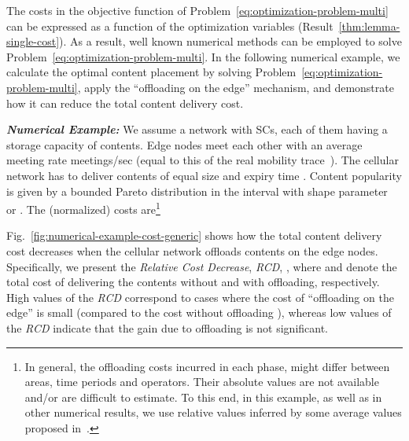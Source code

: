 \documentclass[10pt,conference,letterpaper]{IEEEtran}
\begin{document}
The costs  in the objective function of Problem~\ref{eq:optimization-problem-multi} can be expressed as a function of the optimization variables (Result~\ref{thm:lemma-single-cost}). As a result, well known numerical methods can be employed to solve Problem~\ref{eq:optimization-problem-multi}. In the following numerical example, we calculate the optimal content placement by solving Problem~\ref{eq:optimization-problem-multi}, apply the ``offloading on the edge'' mechanism, and demonstrate how it can reduce the total content delivery cost.

\textbf{\textit{Numerical Example:}} We assume a network with  SCs, each of them having a storage capacity of  contents. Edge nodes meet each other with an average meeting rate  meetings/sec (equal to this of the real mobility trace~\cite{infocom-trace}). The cellular network has to deliver  contents of equal size and expiry time . Content popularity is given by a bounded Pareto distribution in the interval  with shape parameter ~\cite{youtube-traffic-from-edge} or . The (normalized) costs are\footnote{In general, the offloading costs incurred in each phase, might differ between areas, time periods and operators. Their absolute values are not available and/or are difficult to estimate. To this end, in this example, as well as in other numerical results, we use relative values inferred by some average values proposed in~\cite{johansson2007cost}.} 


Fig.~\ref{fig:numerical-example-cost-generic} shows how the total content delivery cost decreases when the cellular network offloads contents on the edge nodes. Specifically, we present the \textit{Relative Cost Decrease}, \textit{RCD}, , where  and  denote the total cost of delivering the contents without and with offloading, respectively. High values of the \textit{RCD} correspond to cases where the cost of ``offloading on the edge''  is small (compared to the cost without offloading ), whereas low values of the \textit{RCD} indicate that the gain due to offloading is not significant.
\end{document}
